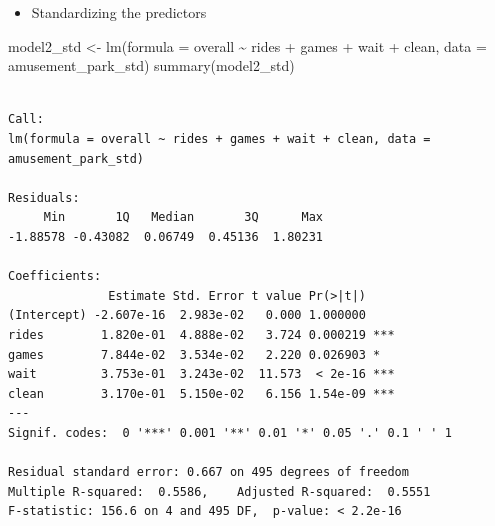 \documentclass[
  ignorenonframetext,
]{beamer}
\newenvironment{Shaded}{\begin{snugshade}}{\end{snugshade}}
\newcommand{\AttributeTok}[1]{\textcolor[rgb]{0.40,0.45,0.13}{#1}}
\newcommand{\FunctionTok}[1]{\textcolor[rgb]{0.28,0.35,0.67}{#1}}
\newcommand{\NormalTok}[1]{\textcolor[rgb]{0.00,0.23,0.31}{#1}}
\newcommand{\OtherTok}[1]{\textcolor[rgb]{0.00,0.23,0.31}{#1}}
\newcommand{\SpecialCharTok}[1]{\textcolor[rgb]{0.37,0.37,0.37}{#1}}
\providecommand{\tightlist}{%
  \setlength{\itemsep}{0pt}\setlength{\parskip}{0pt}}\usepackage{longtable,booktabs,array}
\begin{document}
\begin{frame}[fragile]{}
\label{section-35}
\begin{itemize}
\tightlist
\item
  Standardizing the predictors
\end{itemize}

\tiny

\begin{Shaded}
\begin{Highlighting}[]
\NormalTok{model2\_std }\OtherTok{\textless{}{-}} \FunctionTok{lm}\NormalTok{(}\AttributeTok{formula =}\NormalTok{ overall }\SpecialCharTok{\textasciitilde{}}\NormalTok{ rides }\SpecialCharTok{+}\NormalTok{ games }\SpecialCharTok{+}\NormalTok{ wait }\SpecialCharTok{+}\NormalTok{ clean, }
             \AttributeTok{data =}\NormalTok{ amusement\_park\_std)}
\FunctionTok{summary}\NormalTok{(model2\_std)}
\end{Highlighting}
\end{Shaded}

\begin{verbatim}

Call:
lm(formula = overall ~ rides + games + wait + clean, data = amusement_park_std)

Residuals:
     Min       1Q   Median       3Q      Max 
-1.88578 -0.43082  0.06749  0.45136  1.80231 

Coefficients:
              Estimate Std. Error t value Pr(>|t|)    
(Intercept) -2.607e-16  2.983e-02   0.000 1.000000    
rides        1.820e-01  4.888e-02   3.724 0.000219 ***
games        7.844e-02  3.534e-02   2.220 0.026903 *  
wait         3.753e-01  3.243e-02  11.573  < 2e-16 ***
clean        3.170e-01  5.150e-02   6.156 1.54e-09 ***
---
Signif. codes:  0 '***' 0.001 '**' 0.01 '*' 0.05 '.' 0.1 ' ' 1

Residual standard error: 0.667 on 495 degrees of freedom
Multiple R-squared:  0.5586,    Adjusted R-squared:  0.5551 
F-statistic: 156.6 on 4 and 495 DF,  p-value: < 2.2e-16
\end{verbatim}
\end{frame}
\end{document}
